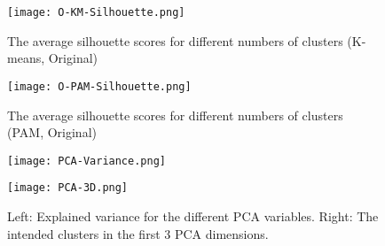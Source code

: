 \documentclass[11pt,twoside,swedish]{article}
\begin{document}
\graphicspath{{/home/mikael/Repos/Courses/msa220/Mini/Mini/mini_big/TCGA-PANCAN-HiSeq-801x20531/}}
\begin{figure}[!htb]
\centering
\texttt{[image: O-KM-Silhouette.png]}
\caption{The average silhouette scores for different numbers of
  clusters (K-means, Original)}
\end{figure}

\begin{table}[ht]
\centering
{}
\caption{The result of k-means clustering on the original data.}
\end{table}

\begin{figure}
\centering
\texttt{[image: O-PAM-Silhouette.png]}
\caption{The average silhouette scores for different numbers of
  clusters (PAM, Original)}
\end{figure}

\begin{table}[ht]
\centering
{}
\caption{The result of PAM clustering on the original data.}
\end{table}

\begin{figure}
\centering
\begin{minipage}{0.45\textwidth}
\texttt{[image: PCA-Variance.png]}
\end{minipage}
\begin{minipage}{0.45\textwidth}
\texttt{[image: PCA-3D.png]}
\end{minipage}
\label{mini 4 pca}
\caption{Left: Explained variance for the different PCA
  variables. Right: The intended clusters in the first 3 PCA dimensions.}
\end{figure}
\end{document}
